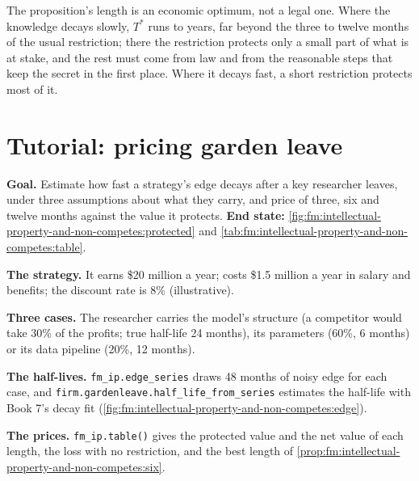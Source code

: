 \label{lst:fm:intellectual-property-and-non-competes:gl}

The proposition's length is an economic optimum, not a legal one. Where the knowledge decays slowly, $T^*$ runs to years, far beyond the three to
twelve months of the usual restriction; there the restriction protects only a small part of what is at stake, and the rest must come from  law and from the reasonable steps that keep the secret in the first place. Where it decays fast, a short restriction protects most of it.

\section{Tutorial: pricing garden leave}\label{tut:fm:intellectual-property-and-non-competes:tut}

\begin{tutorial}
\textbf{Goal.} Estimate how fast a strategy's edge decays after a key researcher leaves, under three assumptions about what they carry, and price
 of three, six and twelve months against the value it protects. \textbf{End state:}
\cref{fig:fm:intellectual-property-and-non-competes:protected} and \cref{tab:fm:intellectual-property-and-non-competes:table}.
\begin{tutsteps}
\item \textbf{The strategy.} It earns \$20 million a year;  costs \$1.5 million a year in salary and benefits; the discount rate is 8\%
(illustrative).
\item \textbf{Three cases.} The researcher carries the model's structure (a competitor would take 30\% of the profits; true half-life 24 months),
its parameters (60\%, 6 months) or its data pipeline (20\%, 12 months).
\item \textbf{The half-lives.} \texttt{fm\_ip.edge\_series} draws 48 months of noisy edge for each case, and \texttt{firm.gardenleave.half\_life\_from\_series}
estimates the half-life with Book 7's decay fit (\cref{fig:fm:intellectual-property-and-non-competes:edge}).
\item \textbf{The prices.} \texttt{fm\_ip.table()} gives the protected value and the net value of each length, the loss with no restriction, and the
best length of \cref{prop:fm:intellectual-property-and-non-competes:six}.
\end{tutsteps}
\end{tutorial}

